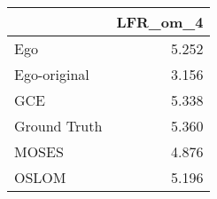 \begin{tabular}{lr}
\toprule
{} & LFR_om_4 \\
\midrule
Ego          &    5.252 \\
Ego-original &    3.156 \\
GCE          &    5.338 \\
Ground Truth &    5.360 \\
MOSES        &    4.876 \\
OSLOM        &    5.196 \\
\bottomrule
\end{tabular}
